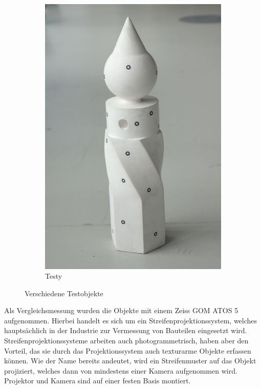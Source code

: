 \documentclass[./00PhotoBox.tex]{subfiles}
\begin{document}
\begin{figure}
\begin{subfigure}{0.32\textwidth}
        \includegraphics[width=1\textwidth]{img/bild_testy.jpg}
        \caption{Testy}
        \label{img:bild_testy}
    \end{subfigure}
    \caption{Verschiedene Testobjekte}
    \label{img:bilder_testobjekte}
\end{figure}

Als Vergleichsmessung wurden die Objekte mit einem Zeiss GOM ATOS 5 aufgenommen. Hierbei handelt es sich um ein Streifenprojektionssystem, welches hauptsächlich in der Industrie zur Vermessung von Bauteilen eingesetzt wird. Streifenprojektionssysteme arbeiten auch photogrammetrisch, haben aber den Vorteil, das sie durch das Projektionssystem auch texturarme Objekte erfassen können. Wie der Name bereits andeutet, wird ein Streifenmuster auf das Objekt projiziert, welches dann von mindestens einer Kamera aufgenommen wird. Projektor und Kamera sind auf einer festen Basis montiert. \citep[S. 581f]{luhmann}
\end{document}
